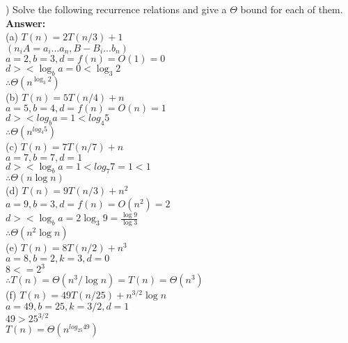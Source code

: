 \documentclass{article}
\begin{document}
\vspace{.3in}
) Solve the following recurrence relations and give a $\Theta$ bound for each of them.\\
\vspace{.1in}
{\bf Answer:} \\
\indent (a) $T(n) = 2T(n/3) + 1$ \\
\indent \indent $(n_{i} A = a_{i} ...a_{n}, B - B_{i} ...b_{n})$ \\
\indent \indent $a = 2, b = 3, d = f(n) = O(1) = 0 $ \\
\indent \indent $d>< \log_b a = 0 < \log_3 2$ \\
\indent \indent $\therefore \Theta(n^{\log_3 2})$ \\

\indent (b) $T(n) = 5T(n/4) + n$ \\
\indent \indent $a = 5, b = 4, d = f(n) = O(n) = 1$ \\
\indent \indent $d ><log_b a = 1 < log_4 5$ \\
\indent \indent $\therefore \Theta(n^{log_4 5})$ \\

\indent (c) $T(n) = 7T(n/7) + n$ \\
\indent \indent $a = 7, b = 7, d = 1$ \\
\indent \indent $d >< \log_b a = 1 < log_7 7 = 1 < 1$ \\
\indent \indent $\therefore \Theta(n \log n)$ \\

\indent (d) $T(n) = 9T(n/3) + n^2$ \\
\indent \indent $a = 9, b = 3, d = f(n) = O(n^2) = 2$ \\
\indent \indent $d >< \log_b a = 2 \log_3 9 = \frac{\log 9} {\log 3}$ \\
\indent \indent $\therefore \Theta(n^{2} \log n)$ \\

\indent (e) $T(n) = 8T(n/2) + n^3$ \\
\indent \indent $a = 8, b = 2, k = 3, d = 0$ \\
\indent \indent $8 <= 2^3$ \\
\indent \indent $\therefore T(n) = \Theta(n^3 / \log n) = T(n) = \Theta(n^3)$ \\

\indent (f) $T(n) = 49T(n/25) + n^{3/2} \log n$ \\
\indent \indent $a = 49, b = 25, k = 3/2, d = 1$ \\
\indent \indent $49 > 25^{3/2}$ \\
\indent \indent $T(n) = \Theta(n^{log_{25} 49})$ \\
\end{document}
